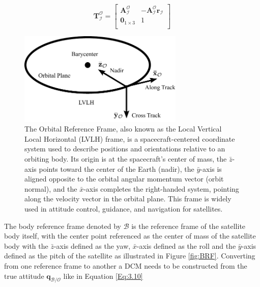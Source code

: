 \begin{equation}
    \mathbf{T}_{\mathcal{I}}^{\mathcal{O}} = 
    \begin{bmatrix}
            \mathbf{A}_{\mathcal{I}}^{\mathcal{O}} & -\mathbf{A}_{\mathcal{I}}^{\mathcal{O}}\mathbf{r}_\mathcal{I} \\
            \mathbf{0}_{1\times3} & 1\\
    \end{bmatrix}
\end{equation}

\begin{figure}[H]
    \centering
    \includegraphics[width=0.7\textwidth]{figures/modelling/LVLH.pdf}
    \caption{The Orbital Reference Frame, also known as the Local Vertical Local Horizontal (LVLH) frame, is a spacecraft-centered coordinate system used to describe positions and orientations relative to an orbiting body. Its origin is at the spacecraft's center of mass, the $\bar{z}$-axis points toward the center of the Earth (nadir), the $\bar{y}$-axis is aligned opposite to the orbital angular momentum vector (orbit normal), and the $\bar{x}$-axis completes the right-handed system, pointing along the velocity vector in the orbital plane. This frame is widely used in attitude control, guidance, and navigation for satellites.}
    \label{fig:3.6}
\end{figure}



The body reference frame denoted by $\mathcal{B}$ is the reference frame of the satellite body itself, with the center point referenced as the center of mass of the satellite 
body with the $\bar{z}$-axis defined as the yaw, $\bar{x}$-axis defined as the roll and the $\bar{y}$-axis defined as the pitch of the satellite as illustrated in Figure \ref{fig:BRF}. Converting from one reference frame to another 
a DCM needs to be constructed from the true attitude $\mathbf{q}_\mathcal{B/O}$ like in Equation \ref{Eq:3.10}

